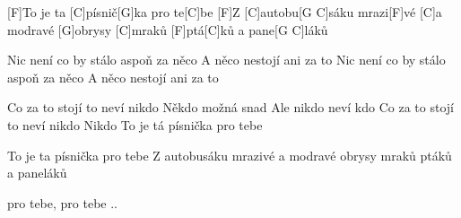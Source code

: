 
[F]To je ta [C]písnič[G]ka pro te[C]be
[F]Z [C]autobu[G C]sáku
mrazi[F]vé [C]a modravé [G]obrysy [C]mraků
[F]ptá[C]ků a pane[G C]láků

Nic není co by stálo aspoň za něco
A něco nestojí ani za to
Nic není co by stálo aspoň za něco
A něco nestojí ani za to

Co za to stojí to neví nikdo
Někdo možná snad Ale nikdo neví kdo
Co za to stojí to neví nikdo Nikdo
To je tá písnička pro tebe

To je ta písnička pro tebe
Z autobusáku
mrazivé a modravé obrysy mraků
ptáků a paneláků

pro tebe, pro tebe ..
